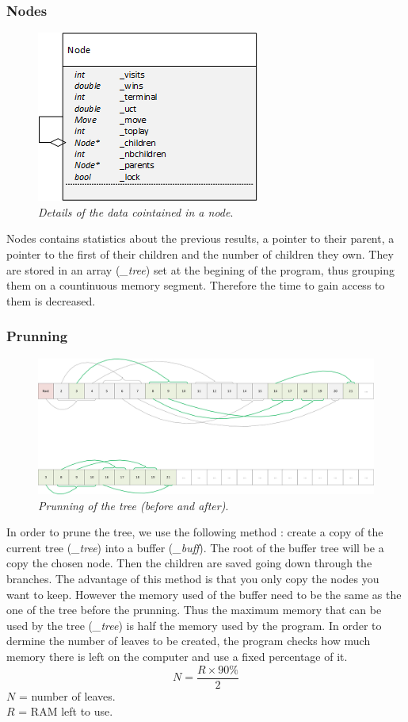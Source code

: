 \subsubsection{Nodes}
\begin{figure}[H] 
\centerline{\includegraphics[scale=0.8]{Data_Structure/Img/Node.png}}
\caption{\label{fig:nodedetails}\textit{Details of the data cointained in a node}.}
\end{figure}
Nodes contains statistics about the previous results, a pointer to their parent, a pointer to the first of their children and the number of children they own. They are stored in an array (\textit{\_tree}) set at the begining of the program, thus grouping them on a countinuous memory segment. Therefore the time to gain access to them is decreased.

\subsubsection{Prunning}
\begin{figure}[H] 
\centerline{\includegraphics[width=\textwidth]{Data_Structure/Img/array.png}}
\caption{\label{fig:arrayprunning}\textit{Prunning of the tree (before and after)}.}
\end{figure}
In order to prune the tree, we use the following method : create a copy of the current tree (\textit{\_tree}) into a buffer (\textit{\_buff}). The root of the buffer tree will be a copy the chosen node. Then the children are saved going down through the branches. The advantage of this method is that you only copy the nodes you want to keep. However the memory used of the buffer need to be the same as the one of the tree before the prunning. Thus the maximum memory that can be used by the tree (\textit{\_tree}) is half the memory used by the program. In order to dermine the number of leaves to be created, the program checks how much memory there is left on the computer and use a fixed percentage of it.
\begin{equation}
N = \frac{R \times 90\%}{2}
\end{equation}
\ensuremath{N} = number of leaves.\\
\ensuremath{R} = RAM left to use.


